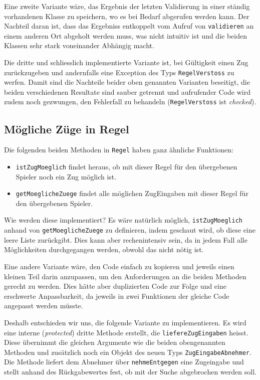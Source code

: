 \documentclass[12pt,halfparskip]{scrartcl}
\begin{document}
Eine zweite Variante wäre, das Ergebnis der letzten Validierung in einer ständig vorhandenen Klasse zu speichern, wo es bei Bedarf abgerufen werden kann. Der Nachteil daran ist, dass das Ergebniss entkoppelt vom Aufruf von \texttt{validieren} an einem anderen Ort abgeholt werden muss, was nicht intuitiv ist und die beiden Klassen sehr stark voneinander Abhängig macht.

Die dritte und schliesslich implementierte Variante ist, bei Gültigkeit einen Zug zurückzugeben und andernfalls eine Exception des Typs \texttt{RegelVerstoss} zu werfen. Damit sind die Nachteile beider oben genannten Varianten beseitigt, die beiden verschiedenen Resultate sind sauber getrennt und aufrufender Code wird zudem noch gezwungen, den Fehlerfall zu behandeln (\texttt{RegelVerstoss} ist \emph{checked}).

\subsection{Mögliche Züge in Regel}
\label{sub:moegliche_zuege_in_regel}

Die folgenden beiden Methoden in \texttt{Regel} haben ganz ähnliche Funktionen:

\begin{itemize}
	\item \texttt{istZugMoeglich} findet heraus, ob mit dieser Regel für den übergebenen Spieler noch ein Zug möglich ist.
	\item \texttt{getMoeglicheZuege} findet alle möglichen ZugEingaben mit dieser Regel für den übergebenen Spieler.
\end{itemize}

Wie werden diese implementiert? Es wäre natürlich möglich, \texttt{istZugMoeglich} anhand von \texttt{getMoeglicheZuege} zu definieren, indem geschaut wird, ob diese eine leere Liste zurückgibt. Dies kann aber rechenintensiv sein, da in jedem Fall alle Möglichkeiten durchgegangen werden, obwohl das nicht nötig ist.

Eine andere Variante wäre, den Code einfach zu kopieren und jeweils einen kleinen Teil darin anzupassen, um den Anforderungen an die beiden Methoden gerecht zu werden. Dies hätte aber duplizierten Code zur Folge und eine erschwerte Anpassbarkeit, da jeweils in zwei Funktionen der gleiche Code angepasst werden müsste.


Deshalb entschieden wir uns, die folgende Variante zu implementieren. Es wird eine interne (\emph{protected}) dritte Methode erstellt, die \texttt{liefereZugEingaben} heisst. Diese übernimmt die gleichen Argumente wie die beiden obengenannten Methoden und zusätzlich noch ein Objekt des neuen Typs \texttt{ZugEingabeAbnehmer}. Die Methode liefert dem Abnehmer über \texttt{nehmeEntgegen} eine Zugeingabe und stellt anhand des Rückgabewertes fest, ob mit der Suche abgebrochen werden soll.
\end{document}
